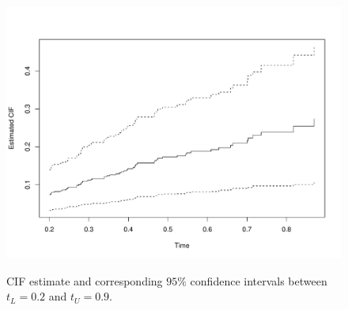  
\begin{figure}[t!]
\centering
\includegraphics[scale = 0.6]{plots/new_CIF-eps-converted-to.pdf}
\label{fig2:timing}
\caption{CIF estimate and corresponding $95\%$ confidence intervals between $t_L = 0.2$ and $t_U = 0.9$.}
\end{figure}

